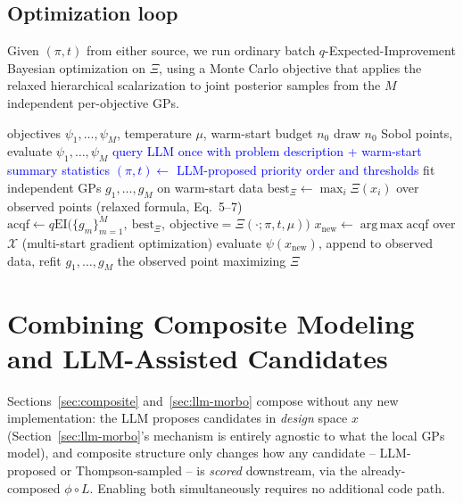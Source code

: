 \documentclass[11pt]{article}
\newcommand{\X}{\mathcal{X}}
\DeclareMathOperator*{\argmax}{arg\,max}
\begin{document}
\subsection{Optimization loop}

Given $(\pi, t)$ from either source, we run ordinary batch
$q$-Expected-Improvement Bayesian optimization on $\Xi$, using a
Monte Carlo objective that applies the relaxed hierarchical scalarization
to joint posterior samples from the $M$ independent per-objective GPs.

\begin{algorithm}[h]
\caption{LLM-automated tiered composite scalarization}
\begin{algorithmic}[1]
\Require objectives $\psi_1,\dots,\psi_M$, temperature $\mu$, warm-start budget $n_0$
\State draw $n_0$ Sobol points, evaluate $\psi_1,\dots,\psi_M$
\State \textcolor{blue}{query LLM once with problem description + warm-start summary statistics}
\State \textcolor{blue}{$(\pi, t) \gets$ LLM-proposed priority order and thresholds}
\State fit independent GPs $g_1, \dots, g_M$ on warm-start data
  \State $\mathrm{best}_\Xi \gets \max_i \Xi(x_i)$ over observed points (relaxed formula, Eq.~5--7)
  \State $\mathrm{acqf} \gets q\mathrm{EI}\big(\{g_m\}_{m=1}^M,\ \mathrm{best}_\Xi,\ \mathrm{objective} = \Xi(\cdot;\pi,t,\mu)\big)$
  \State $x_{\mathrm{new}} \gets \argmax \mathrm{acqf}$ over $\X$ (multi-start gradient optimization)
  \State evaluate $\psi(x_{\mathrm{new}})$, append to observed data, refit $g_1,\dots,g_M$
\EndFor
\State \Return the observed point maximizing $\Xi$
\end{algorithmic}
\end{algorithm}

\section{Combining Composite Modeling and LLM-Assisted Candidates}
\label{sec:llm-composite}

Sections~\ref{sec:composite} and~\ref{sec:llm-morbo} compose without any new
implementation: the LLM proposes candidates in \emph{design} space $x$
(Section~\ref{sec:llm-morbo}'s mechanism is entirely agnostic to what the
local GPs model), and composite structure only changes how any candidate
-- LLM-proposed or Thompson-sampled -- is \emph{scored} downstream, via the
already-composed $\phi \circ L$. Enabling both simultaneously requires no
additional code path.
\end{document}
